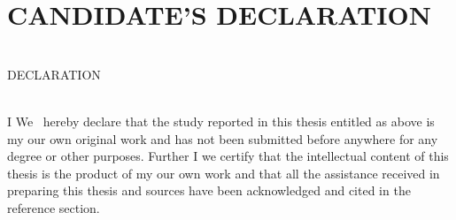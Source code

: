 \chapter*{CANDIDATE'S 	DECLARATION}

\vspace{18pt}
\parbox{\textwidth}{\centering\MakeUppercase{\thetitle}\\
%
\vspace{0.65in}
\MakeUppercase{DECLARATION}}\\[18pt]

\noindent\ifdefined\theStudyType I \else We~\fi
hereby declare that the study reported in this thesis entitled as above is 
\ifdefined\theStudyType my \else our \fi
own original work and has not been 
submitted before anywhere for any degree or other purposes. Further
\ifdefined\theStudyType I \else we \fi
certify that the intellectual content of this thesis is the product of 
\ifdefined\theStudyType my \else our \fi own work and that all the assistance received in preparing this thesis and sources have been acknowledged and cited in the reference section.


\vspace{6ex}


